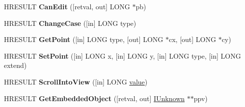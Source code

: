 \begin{DoxyCompactItemize}
\mbox{\label{interfacetom_1_1_i_text_range_a6beaa85d3494d1539b263f2237fb6d7e}} 
H\+R\+E\+S\+U\+LT {\bfseries Can\+Edit} (\mbox{[}retval, out\mbox{]} L\+O\+NG $\ast$pb)
\item 
\mbox{\label{interfacetom_1_1_i_text_range_a29f211b82e168763ef404f0ea7947487}} 
H\+R\+E\+S\+U\+LT {\bfseries Change\+Case} (\mbox{[}in\mbox{]} L\+O\+NG type)
\item 
\mbox{\label{interfacetom_1_1_i_text_range_a623607b4b91d1aa6450e2b14177cef6e}} 
H\+R\+E\+S\+U\+LT {\bfseries Get\+Point} (\mbox{[}in\mbox{]} L\+O\+NG type, \mbox{[}out\mbox{]} L\+O\+NG $\ast$cx, \mbox{[}out\mbox{]} L\+O\+NG $\ast$cy)
\item 
\mbox{\label{interfacetom_1_1_i_text_range_a533b9558f9adcd62b71601ff6242893b}} 
H\+R\+E\+S\+U\+LT {\bfseries Set\+Point} (\mbox{[}in\mbox{]} L\+O\+NG x, \mbox{[}in\mbox{]} L\+O\+NG y, \mbox{[}in\mbox{]} L\+O\+NG type, \mbox{[}in\mbox{]} L\+O\+NG extend)
\item 
\mbox{\label{interfacetom_1_1_i_text_range_ac5f743f9bfc74ded7e8a1e58052cb874}} 
H\+R\+E\+S\+U\+LT {\bfseries Scroll\+Into\+View} (\mbox{[}in\mbox{]} L\+O\+NG \hyperlink{unionvalue}{value})
\item 
\mbox{\label{interfacetom_1_1_i_text_range_a5220fcdd4285a24e0f58b8a0a7cda4ca}} 
H\+R\+E\+S\+U\+LT {\bfseries Get\+Embedded\+Object} (\mbox{[}retval, out\mbox{]} \hyperlink{interface_i_unknown}{I\+Unknown} $\ast$$\ast$ppv)
\end{DoxyCompactItemize}
